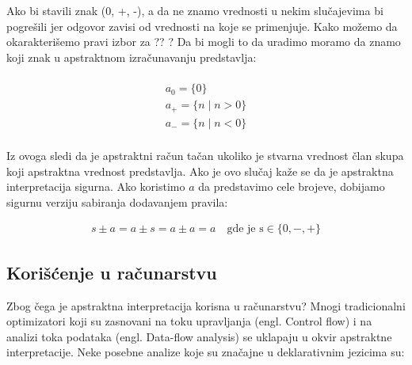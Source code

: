 Ako bi stavili znak (0, +, -), a da ne znamo vrednosti u nekim slu\-čajevima bi pogrešili jer odgovor zavisi od vrednosti na koje se primenjuje. Kako možemo da okarakterišemo pravi izbor za ?? ? Da bi mogli to da uradimo moramo da znamo koji znak u apstraktnom izračunavanju predstavlja:

\begin{multline}	\\
	a_{0} = \{0\}				\\    
	a_{+} = \{n \mid n > 0\}		\\	
	a_{-} = \{n \mid n < 0\}		\\
\end{multline}

Iz ovoga sledi da je apstraktni račun tačan ukoliko je stvarna vrednost član skupa koji apstraktna vrednost predstavlja. Ako je ovo slučaj kaže se da je apstraktna interpretacija sigurna. Ako koristimo $a$ da predstavimo cele brojeve, dobijamo sigurnu verziju sabiranja dodavanjem pravila:

\begin{multline}	
	s \pm a = a \pm s = a \pm a = a \quad \text{gde je s} \in \{0, -, +\}
\end{multline}
\cite{AbramskyHankin}

\subsection{Korišćenje u računarstvu}
\label{subsec:problem1}
Zbog čega je apstraktna interpretacija korisna u računarstvu? Mnogi tradicionalni optimizatori koji su zasnovani na toku upravljanja (engl. Control flow) i na analizi toka podataka (engl. Data-flow analysis) se uklapaju u okvir apstraktne interpretacije. Neke posebne analize koje su značajne u deklarativnim jezicima su:

